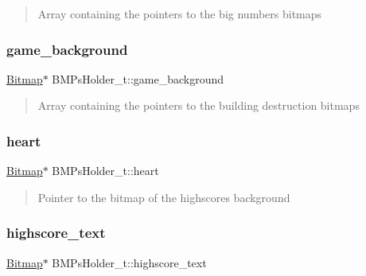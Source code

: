 \begin{quote}
Array containing the pointers to the big numbers bitmaps \end{quote}


\hypertarget{struct_b_m_ps_holder__t_a25d808b859252665b213d2b1430d521a}{}\label{struct_b_m_ps_holder__t_a25d808b859252665b213d2b1430d521a} 
\subsubsection{\texorpdfstring{game\+\_\+background}{game\_background}}
{\footnotesize\ttfamily \hyperlink{struct_bitmap}{Bitmap}$\ast$ B\+M\+Ps\+Holder\+\_\+t\+::game\+\_\+background}



\begin{quote}
Array containing the pointers to the building destruction bitmaps \end{quote}


\hypertarget{struct_b_m_ps_holder__t_a20a8f018e047cf6d61906b9d11b0a622}{}\label{struct_b_m_ps_holder__t_a20a8f018e047cf6d61906b9d11b0a622} 
\subsubsection{\texorpdfstring{heart}{heart}}
{\footnotesize\ttfamily \hyperlink{struct_bitmap}{Bitmap}$\ast$ B\+M\+Ps\+Holder\+\_\+t\+::heart}



\begin{quote}
Pointer to the bitmap of the highscores background \end{quote}


\hypertarget{struct_b_m_ps_holder__t_a363b4830dc5cd37d23062b81c64d1903}{}\label{struct_b_m_ps_holder__t_a363b4830dc5cd37d23062b81c64d1903} 
\subsubsection{\texorpdfstring{highscore\+\_\+text}{highscore\_text}}
{\footnotesize\ttfamily \hyperlink{struct_bitmap}{Bitmap}$\ast$ B\+M\+Ps\+Holder\+\_\+t\+::highscore\+\_\+text}



